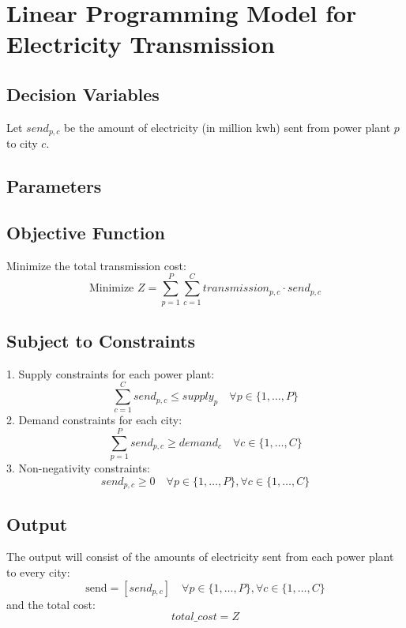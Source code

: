 \documentclass{article}
\begin{document}
\section*{Linear Programming Model for Electricity Transmission}

\subsection*{Decision Variables}
Let \( send_{p,c} \) be the amount of electricity (in million kwh) sent from power plant \( p \) to city \( c \).

\subsection*{Parameters}

\subsection*{Objective Function}
Minimize the total transmission cost:
\[
\text{Minimize } Z = \sum_{p=1}^{P} \sum_{c=1}^{C} transmission_{p,c} \cdot send_{p,c}
\]

\subsection*{Subject to Constraints}
1. Supply constraints for each power plant:
\[
\sum_{c=1}^{C} send_{p,c} \leq supply_p \quad \forall p \in \{1, \ldots, P\}
\]
2. Demand constraints for each city:
\[
\sum_{p=1}^{P} send_{p,c} \geq demand_c \quad \forall c \in \{1, \ldots, C\}
\]
3. Non-negativity constraints:
\[
send_{p,c} \geq 0 \quad \forall p \in \{1, \ldots, P\}, \forall c \in \{1, \ldots, C\}
\]

\subsection*{Output}
The output will consist of the amounts of electricity sent from each power plant to every city:
\[
\text{send} = \left[ send_{p,c} \right] \quad \forall p \in \{1, \ldots, P\}, \forall c \in \{1, \ldots, C\}
\]
and the total cost:
\[
total\_cost = Z
\]
\end{document}
